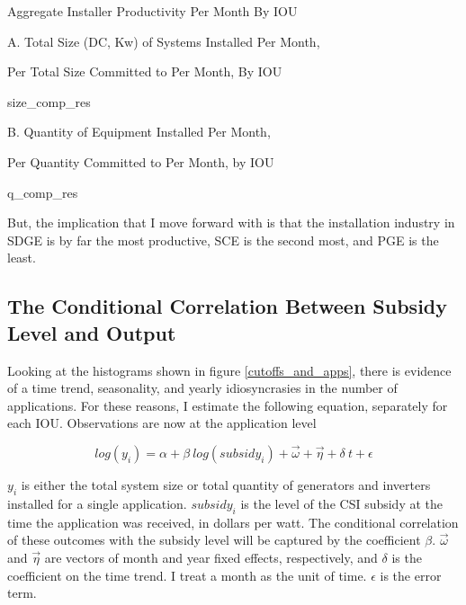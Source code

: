 \documentclass{article}
\begin{document}
\begin{table}
\begin{center}
Aggregate Installer Productivity Per Month By IOU

\vspace{0.5cm}

A. Total Size (DC, Kw) of Systems Installed Per Month, 

Per Total Size Committed to Per Month, By IOU

\vspace{0.25cm}

{size_comp_res}

\vspace{0.5cm}

B. Quantity of Equipment Installed Per Month, 

Per Quantity Committed to Per Month, by IOU

\vspace{0.25cm}

{q_comp_res}
\end{center}
\caption{}
\label{agg_prod_tab}
\end{table}

But, the implication that I move forward with is that the installation industry in SDGE is by far the most productive, SCE is the second most, and PGE is the least.

\subsection{The Conditional Correlation Between Subsidy Level and Output}

Looking at the histograms shown in figure \ref{cutoffs_and_apps}, there is evidence of a time trend, seasonality, and yearly idiosyncrasies in the number of applications. For these reasons, I estimate the following equation, separately for each IOU. Observations are now at the application level

\begin{equation}
log(y_i) = \alpha + \beta ~ log(subsidy_i) + \vec{\omega} + \vec{\eta} + \delta~ t + \epsilon
\end{equation}

$y_i$ is either the total system size or total quantity of generators and inverters installed for a single application. $subsidy_i$ is the level of the CSI subsidy at the time the application was received, in dollars per watt. The conditional correlation of these outcomes with the subsidy level will be captured by the coefficient $\beta$. $\vec{\omega}$ and $\vec{\eta}$ are vectors of month and year fixed effects, respectively, and $\delta$ is the coefficient on the time trend. I treat a month as the unit of time. $\epsilon$ is the error term.
\end{document}

